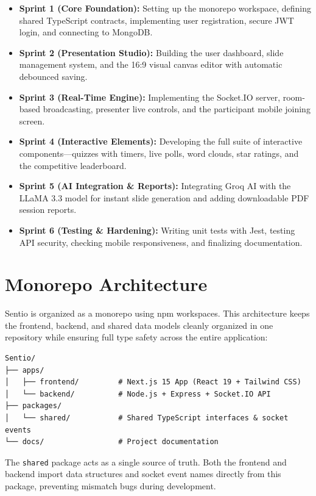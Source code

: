 \begin{itemize}
    \item \textbf{Sprint 1 (Core Foundation):} Setting up the monorepo workspace, defining shared TypeScript contracts, implementing user registration, secure JWT login, and connecting to MongoDB.
    \item \textbf{Sprint 2 (Presentation Studio):} Building the user dashboard, slide management system, and the 16:9 visual canvas editor with automatic debounced saving.
    \item \textbf{Sprint 3 (Real-Time Engine):} Implementing the Socket.IO server, room-based broadcasting, presenter live controls, and the participant mobile joining screen.
    \item \textbf{Sprint 4 (Interactive Elements):} Developing the full suite of interactive components—quizzes with timers, live polls, word clouds, star ratings, and the competitive leaderboard.
    \item \textbf{Sprint 5 (AI Integration \& Reports):} Integrating Groq AI with the LLaMA 3.3 model for instant slide generation and adding downloadable PDF session reports.
    \item \textbf{Sprint 6 (Testing \& Hardening):} Writing unit tests with Jest, testing API security, checking mobile responsiveness, and finalizing documentation.
\end{itemize}

\section{Monorepo Architecture}

Sentio is organized as a monorepo using npm workspaces. This architecture keeps the frontend, backend, and shared data models cleanly organized in one repository while ensuring full type safety across the entire application:

\begin{verbatim}
Sentio/
├── apps/
│   ├── frontend/         # Next.js 15 App (React 19 + Tailwind CSS)
│   └── backend/          # Node.js + Express + Socket.IO API
├── packages/
│   └── shared/           # Shared TypeScript interfaces & socket events
└── docs/                 # Project documentation
\end{verbatim}

The \texttt{shared} package acts as a single source of truth. Both the frontend and backend import data structures and socket event names directly from this package, preventing mismatch bugs during development.

